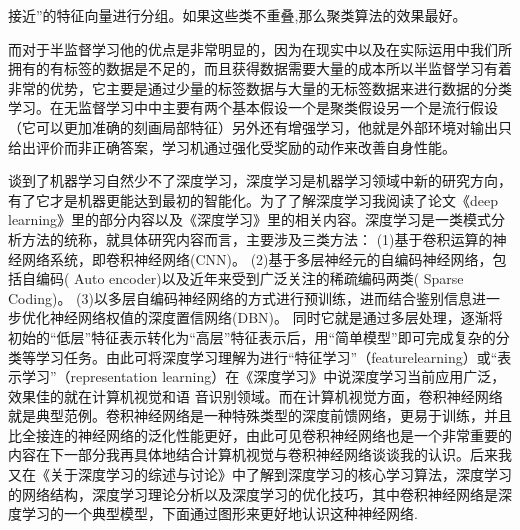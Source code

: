\documentclass{article}
\begin{document}
接近”的特征向量进行分组。如果这些类不重叠,那么聚类算法的效果最好。\par
而对于半监督学习他的优点是非常明显的，因为在现实中以及在实际运用中我们所拥有的有标签的数据是不足的，而且获得数据需要大量的成本所以半监督学习有着非常的优势，它主要是通过少量的标签数据与大量的无标签数据来进行数据的分类学习。在无监督学习中中主要有两个基本假设一个是聚类假设另一个是流行假设（它可以更加准确的刻画局部特征）另外还有增强学习，他就是外部环境对输出只给出评价而非正确答案，学习机通过强化受奖励的动作来改善自身性能。\par
谈到了机器学习自然少不了深度学习，深度学习是机器学习领域中新的研究方向，有了它才是机器更能达到最初的智能化。为了了解深度学习我阅读了论文《deep learning》\citep{SchulzDeep}里的部分内容以及《深度学习》\citep{shenduxuexi}里的相关内容。深度学习是一类模式分析方法的统称，就具体研究内容而言，主要涉及三类方法：
(1)基于卷积运算的神经网络系统，即卷积神经网络(CNN)。 
(2)基于多层神经元的自编码神经网络，包括自编码( Auto encoder)以及近年来受到广泛关注的稀疏编码两类( Sparse Coding)。
(3)以多层自编码神经网络的方式进行预训练，进而结合鉴别信息进一步优化神经网络权值的深度置信网络(DBN)。
同时它就是通过多层处理，逐渐将初始的“低层”特征表示转化为“高层”特征表示后，用“简单模型”即可完成复杂的分类等学习任务。由此可将深度学习理解为进行“特征学习”（featurelearning）或“表示学习”（representation learning）在《深度学习》中说深度学习当前应用广泛，效果佳的就在计算机视觉和语 音识别领域。而在计算机视觉方面，卷积神经网络就是典型范例。卷积神经网络是一种特殊类型的深度前馈网络，更易于训练，并且比全接连的神经网络的泛化性能更好，由此可见卷积神经网络也是一个非常重要的内容在下一部分我再具体地结合计算机视觉与卷积神经网络谈谈我的认识。后来我又在《关于深度学习的综述与讨论》\citep{zongshu}中了解到深度学习的核心学习算法，深度学习的网络结构，深度学习理论分析以及深度学习的优化技巧，其中卷积神经网络是深度学习的一个典型模型，下面通过图形来更好地认识这种神经网络.
\makeatletter

\def\@captype{figure}
\end{document}
